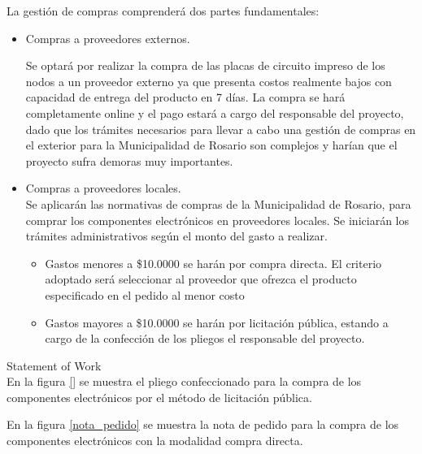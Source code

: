 \documentclass[11pt]{charter}
\begin{document}
La gestión de compras comprenderá dos partes fundamentales:
\begin{itemize}
\item Compras a proveedores externos.

Se optará por realizar la compra de las placas de circuito impreso de los nodos a un proveedor externo ya que presenta costos realmente bajos con capacidad de entrega del producto en 7 días. La compra se hará completamente online y el pago estará a cargo del responsable del proyecto, dado que los trámites necesarios para llevar a cabo una gestión de compras en el exterior para la Municipalidad de Rosario son complejos y harían que el proyecto sufra demoras muy importantes.
\item Compras a proveedores locales.\\
Se aplicarán las normativas de compras de la Municipalidad de Rosario, para comprar los componentes electrónicos en proveedores locales. Se iniciarán los trámites administrativos según el monto del gasto a realizar.
\begin{itemize}
\item Gastos menores a \$10.0000 se harán por compra directa. El criterio adoptado será seleccionar al proveedor que ofrezca el producto especificado en el pedido al menor costo
\item Gastos mayores a \$10.0000 se harán por licitación pública, estando a cargo de la confección de los pliegos el responsable del proyecto. 
\end{itemize}
\end{itemize}

Statement of Work\\
En la figura \ref{} se muestra el pliego confeccionado para la compra de los componentes electrónicos por el método de licitación pública.


En la figura \ref{nota_pedido} se muestra la nota de pedido para la compra de los componentes electrónicos con la modalidad compra directa.
\end{document}
